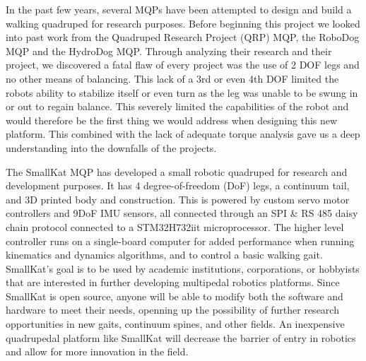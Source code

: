     In the past few years, several MQPs have been attempted to design and build a walking quadruped for research purposes. Before beginning this project we looked into past work from the Quadruped Research Project (QRP) MQP, the RoboDog MQP and the HydroDog MQP. Through analyzing their research and their project, we discovered a fatal flaw of every project was the use of 2 DOF legs and no other means of balancing. This lack of a 3rd or even 4th DOF limited the robots ability to stabilize itself or even turn as the leg was unable to be swung in or out to regain balance. This severely limited the capabilities of the robot and would therefore be the first thing we would address when designing this new platform.  This combined with the lack of adequate torque analysis gave us a deep understanding into the downfalls of the projects. 

    The SmallKat MQP has developed a small robotic quadruped for research and development purposes. It has 4 degree-of-freedom (DoF) legs, a continuum tail, and 3D printed body and construction. This is powered by custom servo motor controllers and 9DoF IMU sensors, all connected through an SPI \& RS 485 daisy chain protocol connected to a STM32H732iit microprocessor. The higher level controller runs on a single-board computer for added performance when running kinematics and dynamics algorithms, and to control a basic walking gait. SmallKat's goal is to be used by academic institutions, corporations, or hobbyists that are interested in further developing multipedal robotics platforms. Since SmallKat is open source, anyone will be able to modify both the software and hardware to meet their needs, openning up the possibility of further research opportunities in new gaits, continuum spines, and other fields. An inexpensive quadrupedal platform like SmallKat will decrease the barrier of entry in robotics and allow for more innovation in the field.
